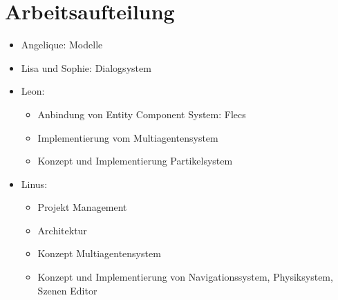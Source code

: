 

\section{Arbeitsaufteilung}

\begin{itemize}
\item Angelique: Modelle
\item Lisa und Sophie: Dialogsystem
\item Leon:
\begin{itemize}
\item Anbindung von Entity Component System: Flecs
\item Implementierung vom Multiagentensystem
\item Konzept und Implementierung Partikelsystem
\end{itemize}
\item Linus:
\begin{itemize}
\item Projekt Management
\item Architektur
\item Konzept Multiagentensystem
\item Konzept und Implementierung von Navigationssystem, Physiksystem, Szenen Editor
\end{itemize}
\end{itemize}